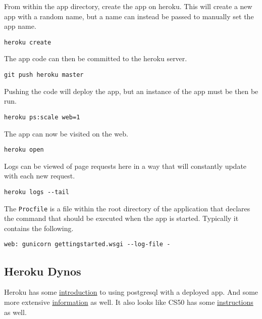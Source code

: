 \documentclass[]{book}
\begin{document}
From within the app directory, create the app on heroku. This will
create a new app with a random name, but a name can instead be passed to
manually set the app name.

\begin{verbatim}
heroku create
\end{verbatim}

The app code can then be committed to the heroku server.

\begin{verbatim}
git push heroku master
\end{verbatim}

Pushing the code will deploy the app, but an instance of the app must be
then be run.

\begin{verbatim}
heroku ps:scale web=1
\end{verbatim}

The app can now be visited on the web.

\begin{verbatim}
heroku open
\end{verbatim}

Logs can be viewed of page requests here in a way that will constantly
update with each new request.

\begin{verbatim}
heroku logs --tail
\end{verbatim}

The \texttt{Procfile} is a file within the root directory of the
application that declares the command that should be executed when the
app is started. Typically it contains the following.

\begin{verbatim}
web: gunicorn gettingstarted.wsgi --log-file -
\end{verbatim}

\subsection{Heroku Dynos}\label{heroku-dynos}

Heroku has some
\href{'https://devcenter.heroku.com/articles/getting-started-with-python\#provision-a-database'}{introduction}
to using postgresql with a deployed app. And some more extensive
\href{'https://devcenter.heroku.com/articles/heroku-postgresql'}{information}
as well. It also looks like CS50 has some
\href{'https://cs50.readthedocs.io/heroku/'}{instructions} as well.
\end{document}
